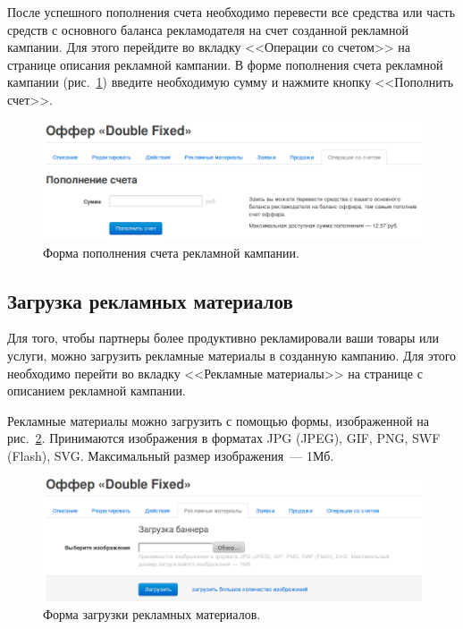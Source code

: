 \documentclass[a4paper,12pt]{article}
\begin{document}
После успешного пополнения счета необходимо перевести все средства или часть средств с основного баланса рекламодателя на счет созданной рекламной кампании. Для этого перейдите во вкладку <<Операции со счетом>> на странице описания рекламной кампании. В форме пополнения счета рекламной кампании (рис.~\ref{fig:offer-operations}) введите необходимую сумму и нажмите кнопку <<Пополнить счет>>.

\begin{figure}[!ht]
\centering
\includegraphics[width=\textwidth]{include/offer-operations.png}
\caption{Форма пополнения счета рекламной кампании.}
\label{fig:offer-operations}
\end{figure}

\subsection{Загрузка рекламных материалов}

Для того, чтобы партнеры более продуктивно рекламировали ваши товары или услуги, можно загрузить рекламные материалы в созданную кампанию. Для этого необходимо перейти во вкладку <<Рекламные материалы>> на странице с описанием рекламной кампании.

Рекламные материалы можно загрузить с помощью формы, изображенной на рис.~\ref{fig:materials}. Принимаются изображения в форматах JPG (JPEG), GIF, PNG, SWF (Flash), SVG. Максимальный размер изображения~--- 1Мб.

\begin{figure}[!ht]
\centering
\includegraphics[width=\textwidth]{include/materials.png}
\caption{Форма загрузки рекламных материалов.}
\label{fig:materials}
\end{figure}
\end{document}
